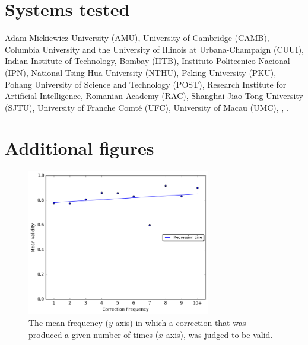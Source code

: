 \documentclass[letterpaper, 11pt]{article}
\begin{document}
\section{Systems tested}\label{ap:abbr}
 Adam Mickiewicz University (AMU),
 University of Cambridge (CAMB), Columbia University and the University of Illinois at Urbana-Champaign (CUUI),
 Indian Institute of Technology, Bombay (IITB), Instituto Politecnico Nacional (IPN),
 National Tsing Hua University (NTHU), Peking University (PKU), Pohang University of Science and Technology (POST),
 Research Institute for Artificial Intelligence, Romanian Academy (RAC), Shanghai Jiao Tong University (SJTU),
 University of Franche Comt\'{e} (UFC), University of Macau (UMC), ,  .
\section{Additional figures}
\begin{figure}[h!]
	\vspace{-.3cm}
	\includegraphics[width=8cm]{IAA_confirmation_frequency}
	\caption{The mean frequency ($y$-axis) in which a correction that was produced
		a given number of times ($x$-axis), was judged to be valid.
		} \label{fig:validity_judgements}
		\vspace{-0.3cm}
		\end{figure}
\end{document}

